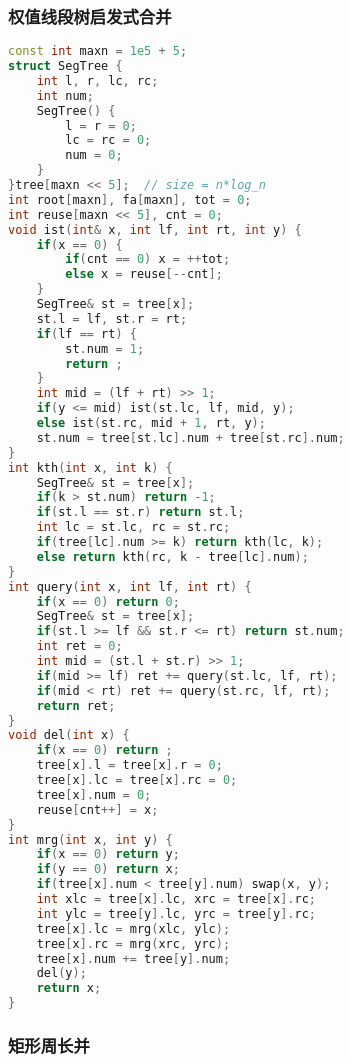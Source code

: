\subsubsection{权值线段树启发式合并}

\begin{lstlisting}[language=C++]
const int maxn = 1e5 + 5;
struct SegTree {
    int l, r, lc, rc;
    int num;
    SegTree() {
        l = r = 0;
        lc = rc = 0;
        num = 0;
    }
}tree[maxn << 5];  // size = n*log_n
int root[maxn], fa[maxn], tot = 0;
int reuse[maxn << 5], cnt = 0;
void ist(int& x, int lf, int rt, int y) {
    if(x == 0) {
        if(cnt == 0) x = ++tot;
        else x = reuse[--cnt];
    }
    SegTree& st = tree[x];
    st.l = lf, st.r = rt;
    if(lf == rt) {
        st.num = 1;
        return ;
    }
    int mid = (lf + rt) >> 1;
    if(y <= mid) ist(st.lc, lf, mid, y);
    else ist(st.rc, mid + 1, rt, y);
    st.num = tree[st.lc].num + tree[st.rc].num;
}
int kth(int x, int k) {
    SegTree& st = tree[x];
    if(k > st.num) return -1;
    if(st.l == st.r) return st.l;
    int lc = st.lc, rc = st.rc;
    if(tree[lc].num >= k) return kth(lc, k);
    else return kth(rc, k - tree[lc].num);
}
int query(int x, int lf, int rt) {
    if(x == 0) return 0;
    SegTree& st = tree[x];
    if(st.l >= lf && st.r <= rt) return st.num;
    int ret = 0;
    int mid = (st.l + st.r) >> 1;
    if(mid >= lf) ret += query(st.lc, lf, rt);
    if(mid < rt) ret += query(st.rc, lf, rt);
    return ret;
}
void del(int x) {
    if(x == 0) return ;
    tree[x].l = tree[x].r = 0;
    tree[x].lc = tree[x].rc = 0;
    tree[x].num = 0;
    reuse[cnt++] = x;
}
int mrg(int x, int y) {
    if(x == 0) return y;
    if(y == 0) return x;
    if(tree[x].num < tree[y].num) swap(x, y);
    int xlc = tree[x].lc, xrc = tree[x].rc;
    int ylc = tree[y].lc, yrc = tree[y].rc;
    tree[x].lc = mrg(xlc, ylc);
    tree[x].rc = mrg(xrc, yrc);
    tree[x].num += tree[y].num;
    del(y);
    return x;
}
\end{lstlisting}

\subsubsection{矩形周长并}

